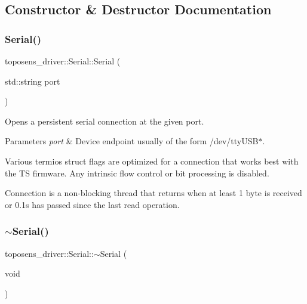 \subsection{Constructor \& Destructor Documentation}
\mbox{\label{classtoposens__driver_1_1Serial_ab66b3b0aba714ac8332d7453833f4294}} 
\subsubsection{\texorpdfstring{Serial()}{Serial()}}
{\footnotesize\ttfamily toposens\+\_\+driver\+::\+Serial\+::\+Serial (\begin{DoxyParamCaption}\item[{std\+::string}]{port }\end{DoxyParamCaption})}

Opens a persistent serial connection at the given port. 
\begin{DoxyParams}{Parameters}
{\em port} & Device endpoint usually of the form /dev/tty\+U\+S\+B$\ast$.\\
\hline
\end{DoxyParams}
Various termios struct flags are optimized for a connection that works best with the TS firmware. Any intrinsic flow control or bit processing is disabled.

Connection is a non-\/blocking thread that returns when at least 1 byte is received or 0.\+1s has passed since the last read operation. \mbox{\label{classtoposens__driver_1_1Serial_a7970e34fd2b626baa989a7a08e3b2e7f}} 
\subsubsection{\texorpdfstring{$\sim$\+Serial()}{~Serial()}}
{\footnotesize\ttfamily toposens\+\_\+driver\+::\+Serial\+::$\sim$\+Serial (\begin{DoxyParamCaption}\item[{void}]{ }\end{DoxyParamCaption})}

